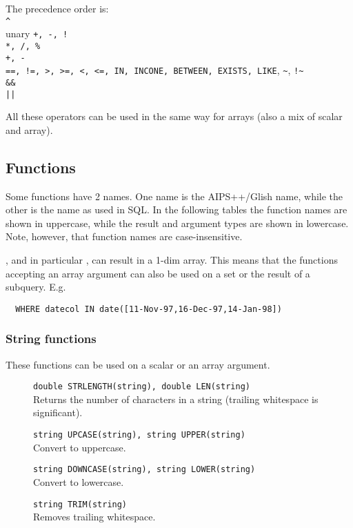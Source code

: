 \begin{description}
  \item The precedence order is:
       \\\verb+^+
       \\unary \texttt{+, -, !}
       \\\texttt{*, /, \%}
       \\\texttt{+, -}
       \\\texttt{==, !=, >, >=, <, <=, IN, INCONE, BETWEEN, EXISTS, LIKE},
              \verb+~+, \verb+!~+
       \\\texttt{\&\&}
       \\\verb+||+
\end{description}
All these operators can be used in the same way for arrays
(also a mix of scalar and array).

\subsection{\label{TAQL:FUNCTIONS}Functions}
Some functions have 2 names. One name is the AIPS++/Glish name, while the
other is the name as used in SQL.
In the following tables the function names are shown in uppercase,
while the result and argument types are shown in lowercase.
Note, however, that function names are case-insensitive.

, and in particular
, can result in a 1-dim array.
This means that the functions accepting an array argument can also
be used on a set or the result of a subquery. E.g.
\begin{verbatim}
  WHERE datecol IN date([11-Nov-97,16-Dec-97,14-Jan-98])
\end{verbatim}
\subsubsection{String functions}
These functions can be used on a scalar or an array argument.
\begin{description}
  \item[] \texttt{double STRLENGTH(string),  double LEN(string)}\\
       Returns the number of characters in a string
       (trailing whitespace is significant).
  \item[] \texttt{string UPCASE(string), string UPPER(string) }\\
        Convert to uppercase.
  \item[] \texttt{string DOWNCASE(string),  string LOWER(string)}\\
        Convert to lowercase.
  \item[] \texttt{string TRIM(string)}\\
       Removes trailing whitespace.
\end{description}

